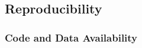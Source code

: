 \subsection{Reproducibility}
\label{sec:method:experiment:reproducibility}

\subsubsection{Code and Data Availability}
\label{sec:method:reproducibility:availability}

